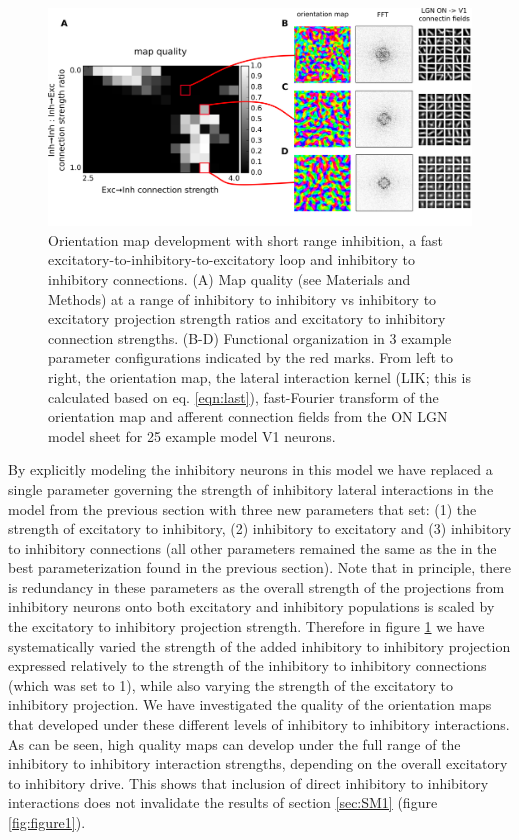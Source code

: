 \documentclass[utf8]{frontiersSCNS}
\begin{document}
\begin{figure}[htpb!] 
\centering
\includegraphics[width=16cm]{./SVG/Figure2/figure2.png}
\caption{Orientation map development with short range inhibition, a fast excitatory-to-inhibitory-to-excitatory loop and inhibitory to inhibitory connections. (A) Map quality (see Materials and Methods) at a range of 
inhibitory to inhibitory vs inhibitory to excitatory projection strength ratios and excitatory to inhibitory connection strengths. (B-D) Functional organization in 3 example parameter configurations 
indicated by the red marks. From left to right, the orientation map, the lateral interaction kernel (LIK; this is calculated based on eq. \ref{eqn:last}), fast-Fourier transform of the orientation map and afferent connection fields from the ON LGN model sheet for 25 example model V1 neurons. }
\label{fig:figure2}
\end{figure} 

By explicitly modeling the inhibitory neurons in this model we have replaced a single parameter governing the strength of inhibitory
lateral interactions in the model from the previous section with three new parameters that set: (1) the strength of excitatory to inhibitory,
(2) inhibitory to excitatory and (3) inhibitory to inhibitory connections (all other parameters remained the same as the 
in the best parameterization found in the previous section). Note that in principle, there is redundancy in these parameters as
the overall strength of the projections from inhibitory neurons onto both excitatory and inhibitory populations is scaled by the 
excitatory to inhibitory projection strength. Therefore in figure \ref{fig:figure2} we have systematically varied the strength of the added inhibitory to inhibitory
projection expressed relatively to the strength of the inhibitory to inhibitory connections (which was set to 1), while also varying the 
strength of the excitatory to inhibitory projection. We have investigated the quality of the orientation 
maps that developed under these different levels of inhibitory to inhibitory interactions. As can be seen, high quality maps 
can develop under the full range of the inhibitory to inhibitory interaction strengths, depending on the overall 
excitatory to inhibitory drive. This shows that inclusion of direct inhibitory to inhibitory interactions does not 
invalidate the results of section \ref{sec:SM1} (figure \ref{fig:figure1}).
\end{document}
